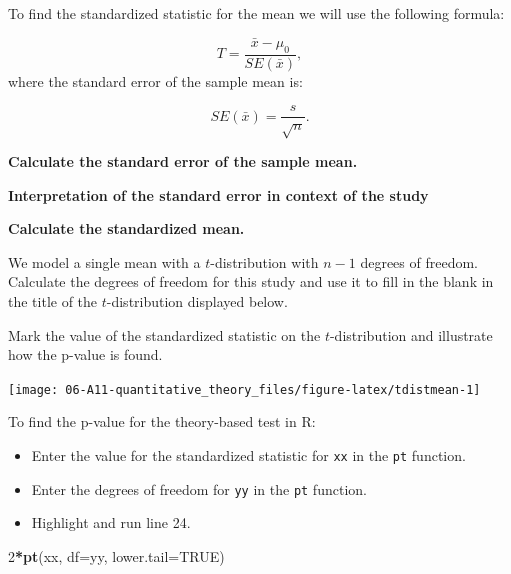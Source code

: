 \documentclass[
]{report}
\newenvironment{Shaded}{\begin{snugshade}}{\end{snugshade}}
\newcommand{\AttributeTok}[1]{\textcolor[rgb]{0.13,0.29,0.53}{#1}}
\newcommand{\ConstantTok}[1]{\textcolor[rgb]{0.56,0.35,0.01}{#1}}
\newcommand{\DecValTok}[1]{\textcolor[rgb]{0.00,0.00,0.81}{#1}}
\newcommand{\FunctionTok}[1]{\textcolor[rgb]{0.13,0.29,0.53}{\textbf{#1}}}
\newcommand{\NormalTok}[1]{#1}
\newcommand{\SpecialCharTok}[1]{\textcolor[rgb]{0.81,0.36,0.00}{\textbf{#1}}}
\begin{document}
To find the standardized statistic for the mean we will use the following formula:

\[T = \frac{\bar{x} - \mu_0}{SE(\bar{x})},\]
where the standard error of the sample mean is:

\[SE(\bar{x})=\frac{s}{\sqrt{n}}.\]

\textbf{Calculate the standard error of the sample mean.}

\vspace{0.5in}

\textbf{Interpretation of the standard error in context of the study}

\vspace{0.8in}

\textbf{Calculate the standardized mean.}

\vspace{0.8in}

We model a single mean with a \(t\)-distribution with \(n-1\) degrees of freedom. Calculate the degrees of freedom for this study and use it to fill in the blank in the title of the \(t\)-distribution displayed below.

\vspace{0.2in}

Mark the value of the standardized statistic on the \(t\)-distribution and illustrate how the p-value is found.

\begin{center}\texttt{[image: 06-A11-quantitative\_theory\_files/figure-latex/tdistmean-1]} \end{center}
\newpage

To find the p-value for the theory-based test in R:

\begin{itemize}
\item
  Enter the value for the standardized statistic for \texttt{xx} in the \texttt{pt} function.
\item
  Enter the degrees of freedom for \texttt{yy} in the \texttt{pt} function.
\item
  Highlight and run line 24.
\end{itemize}

\begin{Shaded}
\begin{Highlighting}[]
\DecValTok{2}\SpecialCharTok{*}\FunctionTok{pt}\NormalTok{(xx, }\AttributeTok{df=}\NormalTok{yy, }\AttributeTok{lower.tail=}\ConstantTok{TRUE}\NormalTok{)}
\end{Highlighting}
\end{Shaded}
\end{document}
